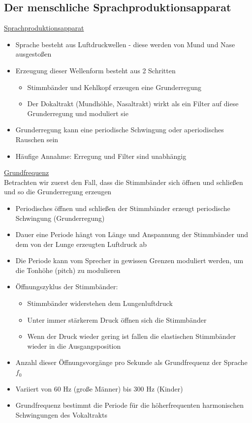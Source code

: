 \documentclass[a4paper,10pt,oneside]{article}
\begin{document}
\subsection{Der menschliche Sprachproduktionsapparat} 
\underline{Sprachproduktionsapparat} \\ 		
 	\begin{itemize}
 		\item Sprache besteht aus Luftdruckwellen - diese werden von Mund und Nase ausgestoßen
 		\item Erzeugung dieser Wellenform besteht aus 2 Schritten
 			\begin{itemize}
 				\item Stimmbänder und Kehlkopf erzeugen eine Grunderregung
 				\item Der Dokaltrakt (Mundhöhle, Nasaltrakt) wirkt als ein Filter auf diese Grunderregung und moduliert sie
 			\end{itemize}
 		\item Grunderregung kann eine periodische Schwingung oder aperiodisches Rauschen sein
 		\item Häufige Annahme: Erregung und Filter sind unabhängig
 	\end{itemize}
 
\underline{Grundfrequenz} \\
Betrachten wir zuerst den Fall, dass die Stimmbänder sich öffnen und schließen und so die Grunderregung erzeugen
	\begin{itemize}	
		\item Periodisches öffnen und schließen der Stimmbänder erzeugt periodische Schwingung (Grunderregung)
		\item Dauer eine Periode hängt von Länge und Anspannung der Stimmbänder und dem von der Lunge erzeugten Luftdruck ab
		\item Die Periode kann vom Sprecher in gewissen Grenzen moduliert werden, um die Tonhöhe (pitch) zu modulieren
		\item Öffnungszyklus der Stimmbänder:
			\begin{itemize}
				\item Stimmbänder widerstehen dem Lungenluftdruck
				\item Unter immer stärkerem Druck öffnen sich die Stimmbänder
				\item Wenn der Druck wieder gering ist fallen die elastischen Stimmbänder wieder in die Ausgangsposition
			\end{itemize}
		\item Anzahl dieser Öffnungsvorgänge pro Sekunde als Grundfrequenz der Sprache $f_0$
		\item Variiert von 60 Hz (große Männer) bis 300 Hz (Kinder)
		\item Grundfrequenz bestimmt die Periode für die höherfrequenten harmonischen Schwingungen des Vokaltrakts
	\end{itemize}
	
\end{document}
